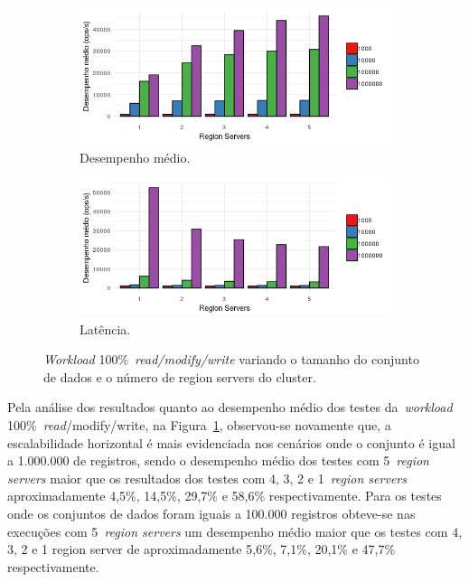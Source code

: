 \documentclass[12pt]{article}
\begin{document}
\begin{figure}[!ht]
    \centering
    \begin{subfigure}[b]{0.49\textwidth}
        \centering
        \includegraphics[width=\textwidth]{images/figura19}
        \caption{Desempenho médio.}
        \label{figura19}
    \end{subfigure}
        \hfill
    \begin{subfigure}[b]{0.49\textwidth}  
        \centering 
        \includegraphics[width=\textwidth]{images/figura20}
        \caption{Latência.}%
        \label{figura20}
    \end{subfigure}
    \caption{\emph{Workload} 100\%~\emph{read/modify/write} variando o tamanho do conjunto de dados e o número de region servers do cluster.}
\end{figure}

Pela análise dos resultados quanto ao desempenho médio dos testes da~\emph{workload} 100\%~\emph{read}/modify/write, na Figura~\ref{figura19}, observou-se novamente que, a escalabilidade horizontal é mais evidenciada nos cenários onde o conjunto é igual a 1.000.000 de registros, sendo o desempenho médio dos testes com 5~\emph{region servers} maior que os resultados dos testes com 4, 3, 2 e 1~\emph{region servers} aproximadamente 4,5\%, 14,5\%, 29,7\% e 58,6\% respectivamente.
Para os testes onde os conjuntos de dados foram iguais a 100.000 registros obteve-se nas execuções com 5~\emph{region servers} um desempenho médio maior que os testes com 4, 3, 2 e 1 region server de aproximadamente 5,6\%, 7,1\%, 20,1\% e 47,7\% respectivamente.
\end{document}
